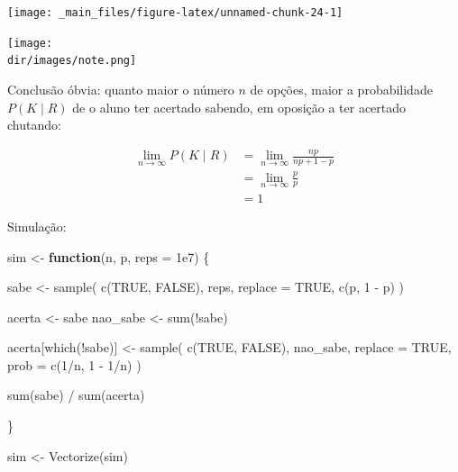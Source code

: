 \documentclass[
  11pt]{report}
\newenvironment{Shaded}{\begin{snugshade}}{\end{snugshade}}
\newcommand{\AttributeTok}[1]{\textcolor[rgb]{0.77,0.63,0.00}{#1}}
\newcommand{\ConstantTok}[1]{\textcolor[rgb]{0.00,0.00,0.00}{#1}}
\newcommand{\ControlFlowTok}[1]{\textcolor[rgb]{0.13,0.29,0.53}{\textbf{#1}}}
\newcommand{\DecValTok}[1]{\textcolor[rgb]{0.00,0.00,0.81}{#1}}
\newcommand{\FloatTok}[1]{\textcolor[rgb]{0.00,0.00,0.81}{#1}}
\newcommand{\FunctionTok}[1]{\textcolor[rgb]{0.00,0.00,0.00}{#1}}
\newcommand{\NormalTok}[1]{#1}
\newcommand{\OtherTok}[1]{\textcolor[rgb]{0.56,0.35,0.01}{#1}}
\newcommand{\SpecialCharTok}[1]{\textcolor[rgb]{0.00,0.00,0.00}{#1}}
\newcommand{\dir}{/ssd/R/x86_64-pc-linux-gnu-library/4.1/fnaufelRmd/rmarkdown/resources}
\newenvironment{rmdnote}
{
  \begin{mynote}
    \texttt{[image: \\dir/images/note.png]}
    \tcblower
  }
  {
  \end{mynote}
}
\renewenvironment{Shaded}{
    \begin{mdframed}[%
      roundcorner=2pt,%
      innerleftmargin=5pt,%
      innerrightmargin=5pt,%
      topline=true,%
      leftline=true,%
      rightline=true,%
      bottomline=true,%
      linewidth=0.5pt,%
      linecolor=black!20,%
      backgroundcolor=black!2,%
      skipabove=2ex,%
      skipbelow=2.5ex%
    ]%
  }
  {
    \end{mdframed}
  }
\begin{document}
\begin{center}\texttt{[image: \_main\_files/figure-latex/unnamed-chunk-24-1]} \end{center}

\begin{rmdnote}
Conclusão óbvia: quanto maior o número $n$ de opções, maior a probabilidade $P(K \mid R)$ de o aluno ter acertado sabendo, em oposição a ter acertado chutando:

\[
\begin{aligned}
\lim_{n \to \infty} P(K \mid R) 
&=
\lim_{n \to \infty} \frac{np}{np + 1 - p} \\
&=
\lim_{n \to \infty} \frac{p}{p} \\
&= 1
\end{aligned}
\]

\end{rmdnote}

Simulação:

\begin{Shaded}
\begin{Highlighting}[]
\NormalTok{sim }\OtherTok{\textless{}{-}} \ControlFlowTok{function}\NormalTok{(n, p, }\AttributeTok{reps =} \FloatTok{1e7}\NormalTok{) \{}
  
\NormalTok{  sabe }\OtherTok{\textless{}{-}} \FunctionTok{sample}\NormalTok{(}
    \FunctionTok{c}\NormalTok{(}\ConstantTok{TRUE}\NormalTok{, }\ConstantTok{FALSE}\NormalTok{), }
\NormalTok{    reps,}
    \AttributeTok{replace =} \ConstantTok{TRUE}\NormalTok{,}
    \FunctionTok{c}\NormalTok{(p, }\DecValTok{1} \SpecialCharTok{{-}}\NormalTok{ p)}
\NormalTok{  )}

\NormalTok{  acerta }\OtherTok{\textless{}{-}}\NormalTok{ sabe}
\NormalTok{  nao\_sabe }\OtherTok{\textless{}{-}} \FunctionTok{sum}\NormalTok{(}\SpecialCharTok{!}\NormalTok{sabe)}
  
\NormalTok{  acerta[}\FunctionTok{which}\NormalTok{(}\SpecialCharTok{!}\NormalTok{sabe)] }\OtherTok{\textless{}{-}} 
    \FunctionTok{sample}\NormalTok{(}
      \FunctionTok{c}\NormalTok{(}\ConstantTok{TRUE}\NormalTok{, }\ConstantTok{FALSE}\NormalTok{),}
\NormalTok{      nao\_sabe,}
      \AttributeTok{replace =} \ConstantTok{TRUE}\NormalTok{,}
      \AttributeTok{prob =} \FunctionTok{c}\NormalTok{(}\DecValTok{1}\SpecialCharTok{/}\NormalTok{n, }\DecValTok{1} \SpecialCharTok{{-}} \DecValTok{1}\SpecialCharTok{/}\NormalTok{n)}
\NormalTok{    )}
  
  \FunctionTok{sum}\NormalTok{(sabe) }\SpecialCharTok{/} \FunctionTok{sum}\NormalTok{(acerta)}
  
\NormalTok{\}}

\NormalTok{sim }\OtherTok{\textless{}{-}} \FunctionTok{Vectorize}\NormalTok{(sim)}
\end{Highlighting}
\end{Shaded}
\end{document}
